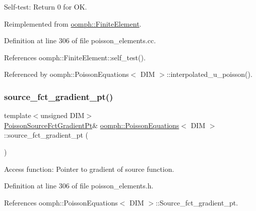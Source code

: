 Self-\/test\+: Return 0 for OK. 



Reimplemented from \hyperlink{classoomph_1_1FiniteElement_af94c5a5e22175d5420b33b3b79e46ed3}{oomph\+::\+Finite\+Element}.



Definition at line 306 of file poisson\+\_\+elements.\+cc.



References oomph\+::\+Finite\+Element\+::self\+\_\+test().



Referenced by oomph\+::\+Poisson\+Equations$<$ D\+I\+M $>$\+::interpolated\+\_\+u\+\_\+poisson().

\mbox{\label{classoomph_1_1PoissonEquations_a6beea1917ccf0bd6fd794e2aaee36a9b}} 
\subsubsection{\texorpdfstring{source\+\_\+fct\+\_\+gradient\+\_\+pt()}{source\_fct\_gradient\_pt()}\hspace{0.1cm}{\footnotesize\ttfamily [1/2]}}
{\footnotesize\ttfamily template$<$unsigned D\+IM$>$ \\
\hyperlink{classoomph_1_1PoissonEquations_a6182c46eb07d6219d6f939f0962724c4}{Poisson\+Source\+Fct\+Gradient\+Pt}\& \hyperlink{classoomph_1_1PoissonEquations}{oomph\+::\+Poisson\+Equations}$<$ D\+IM $>$\+::source\+\_\+fct\+\_\+gradient\+\_\+pt (\begin{DoxyParamCaption}{ }\end{DoxyParamCaption})\hspace{0.3cm}{\ttfamily [inline]}}



Access function\+: Pointer to gradient of source function. 



Definition at line 306 of file poisson\+\_\+elements.\+h.



References oomph\+::\+Poisson\+Equations$<$ D\+I\+M $>$\+::\+Source\+\_\+fct\+\_\+gradient\+\_\+pt.

\mbox{\label{classoomph_1_1PoissonEquations_a0c3464f9f803d3a0366d0b254b8cddc4}} 
